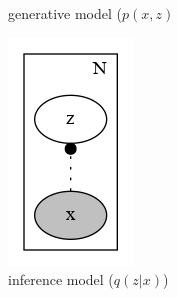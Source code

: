 \documentclass[11pt, a4paper]{report}
\theoremstyle{plain}
\theoremstyle{definition}
\theoremstyle{remark}
\begin{document}
\begin{figure}[!h]
\begin{framed}
\begin{subfigure}[b]{0.2\textwidth}
\caption{generative model ($p(x,z)$}
\end{subfigure}
\begin{subfigure}[b]{0.2\textwidth}
\includegraphics[width=\textwidth]{plots/vae_q.gv.png}
\caption{inference model ($q(z|x)$)}
\end{subfigure}
\begin{subfigure}[b]{0.2\textwidth}

\end{subfigure}
\end{framed}
\end{figure}
\end{document}
